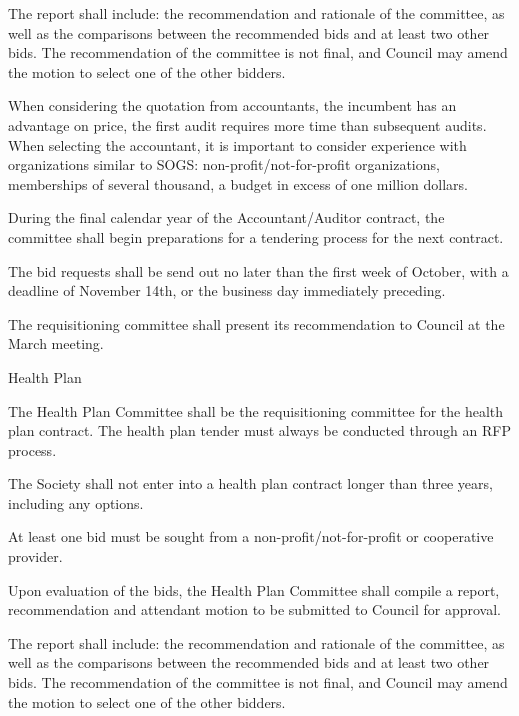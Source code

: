 \begin{longenum}[label*=\thesection.\arabic*., align=left]
\begin{longenum} [label*=\arabic*., align=left]
\begin{longenum} [label*=\arabic*., align=left]
			\item The report shall include: the recommendation and rationale of the committee, as well as the comparisons between the recommended bids and at least two other bids. The recommendation of the committee is not final, and Council may amend the motion to select one of the other bidders.
			
			\item When considering the quotation from accountants, the incumbent has an advantage on price, the first audit requires more time than subsequent audits. When selecting the accountant, it is important to consider experience with organizations similar to SOGS: non-profit/not-for-profit organizations, memberships of several thousand, a budget in excess of one million dollars. 
			
			\item During the final calendar year of the Accountant/Auditor contract, the committee shall begin preparations for a tendering process for the next contract.
			
			\item The bid requests shall be send out no later than the first week of October, with a deadline of November 14th, or the business day immediately preceding.
			
			\item The requisitioning committee shall present its recommendation to Council at the March meeting. 
\end{longenum}
\item Health Plan
		\begin{longenum} [label*=\arabic*., align=left]
			\item The Health Plan Committee shall be the requisitioning committee for the health plan contract. The health plan tender must always be conducted through an RFP process.
			
		\item 	The Society shall not enter into a health plan contract longer than three years, including any options.
			
		\item 	At least one bid must be sought from a non-profit/not-for-profit or cooperative provider.
			
		\item 	Upon evaluation of the bids, the Health Plan Committee shall compile a report, recommendation and attendant motion to be submitted to Council for approval. 
			
		\item 	The report shall include: the recommendation and rationale of the committee, as well as the comparisons between the recommended bids and at least two other bids. The recommendation of the committee is not final, and Council may amend the motion to select one of the other bidders.
			

\end{longenum}
\end{longenum}
\end{longenum}
